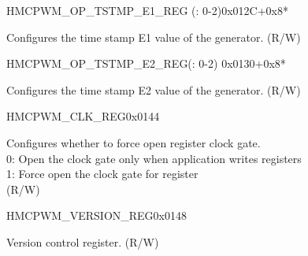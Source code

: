 \begin{register}{H}{MCPWM\_OP\_TSTMP\_E1\_REG (: 0-2)}{0x012C+0x8*}\label{regdesc:MCPWMOPNTSTMPE1REG}
%
%
\regnewline%
\begin{regdesc}\begin{reglist}
\label{fielddesc:MCPWMOPNTSTMPE1}\item [MCPWM\_OP\regindex{n}\_TSTMP\_E1] Configures the time stamp E1 value of the generator. (R/W)
\end{reglist}\end{regdesc}
\end{register}


\begin{register}{H}{MCPWM\_OP\_TSTMP\_E2\_REG(: 0-2)}
{0x0130+0x8*}\label{regdesc:MCPWMOPNTSTMPE2REG}
%
%
\regnewline%
\begin{regdesc}\begin{reglist}
\label{fielddesc:MCPWMOPNTSTMPE2}\item [MCPWM\_OP\regindex{n}\_TSTMP\_E2] Configures the time stamp E2 value of the generator. (R/W)
\end{reglist}\end{regdesc}
\end{register}


\begin{register}{H}{MCPWM\_CLK\_REG}{0x0144}\label{regdesc:MCPWMCLKREG}
%
%
\regnewline%
\begin{regdesc}\begin{reglist}
\label{fielddesc:MCPWMCLKEN}\item [MCPWM\_CLK\_EN] Configures whether to force open register clock gate.\\0: Open the clock gate only when application writes registers\\1: Force open the clock gate for register \\(R/W)
\end{reglist}\end{regdesc}
\end{register}


\begin{register}{H}{MCPWM\_VERSION\_REG}{0x0148}\label{regdesc:MCPWMVERSIONREG}
%
%
%
\regnewline%
\begin{regdesc}\begin{reglist}
\label{fielddesc:MCPWMDATE}\item [MCPWM\_DATE] Version control register. (R/W)
\end{reglist}\end{regdesc}
\end{register}

